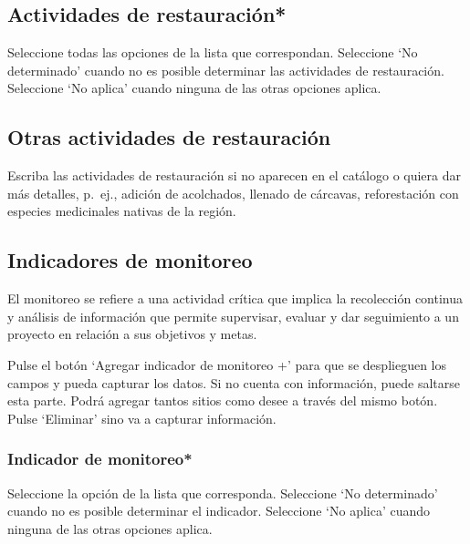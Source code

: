 \documentclass[
]{book}
\begin{document}
\hypertarget{actividades-de-restauraciuxf3n}{%
\subsection{Actividades de restauración*}\label{actividades-de-restauraciuxf3n}}

Seleccione todas las opciones de la lista que correspondan.
Seleccione `No determinado' cuando no es posible determinar las actividades de restauración.
Seleccione `No aplica' cuando ninguna de las otras opciones aplica.

\hypertarget{otras-actividades-de-restauraciuxf3n}{%
\subsection{Otras actividades de restauración}\label{otras-actividades-de-restauraciuxf3n}}

Escriba las actividades de restauración si no aparecen en el catálogo o quiera dar más detalles, p.~ej., adición de acolchados, llenado de cárcavas, reforestación con especies medicinales nativas de la región.

\hypertarget{indicadores-de-monitoreo}{%
\subsection{Indicadores de monitoreo}\label{indicadores-de-monitoreo}}

El monitoreo se refiere a una actividad crítica que implica la recolección continua y análisis de información que permite supervisar, evaluar y dar seguimiento a un proyecto en relación a sus objetivos y metas.

Pulse el botón `Agregar indicador de monitoreo +' para que se desplieguen los campos y pueda capturar los datos. Si no cuenta con información, puede saltarse esta parte.
Podrá agregar tantos sitios como desee a través del mismo botón.
Pulse `Eliminar' sino va a capturar información.

\hypertarget{indicador-de-monitoreo}{%
\subsubsection{Indicador de monitoreo*}\label{indicador-de-monitoreo}}

Seleccione la opción de la lista que corresponda.
Seleccione `No determinado' cuando no es posible determinar el indicador.
Seleccione `No aplica' cuando ninguna de las otras opciones aplica.
\end{document}
